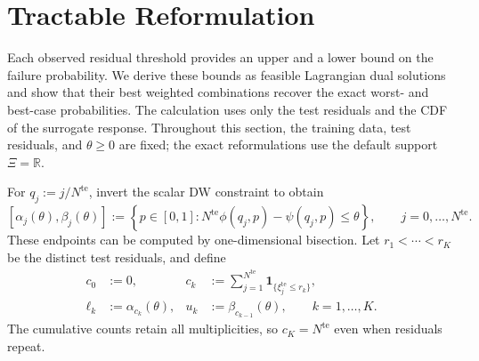 \section{Tractable Reformulation}
\label{sec-reformulation}

Each observed residual threshold provides an upper and a lower bound on the failure probability. We derive these bounds as feasible Lagrangian dual solutions and show that their best weighted combinations recover the exact worst- and best-case probabilities. The calculation uses only the test residuals and the CDF of the surrogate response. Throughout this section, the training data, test residuals, and $\theta\ge0$ are fixed; the exact reformulations use the default support $\Xi=\mathbb R$.

For $q_j:=j/N^{\mathrm{te}}$, invert the scalar DW constraint to obtain
\begin{equation}
  \left[\alpha_j(\theta),\beta_j(\theta)\right]
  :=\left\{p\in[0,1]:
  N^{\mathrm{te}}\phi\left(q_j,p\right)-\psi\left(q_j,p\right)\le\theta\right\},
  \qquad j=0,\ldots,N^{\mathrm{te}}.
  \label{eq-dw-rank-acceptance}
\end{equation}
These endpoints can be computed by one-dimensional bisection. Let $r_1<\cdots<r_K$ be the distinct test residuals, and define
\begin{equation}
  \begin{aligned}
    c_0&:=0,&
    c_k&:=\sum_{j=1}^{N^{\mathrm{te}}}\mathbf1_{\{\xi_j^{\mathrm{te}}\le r_k\}},\\
    \ell_k&:=\alpha_{c_k}(\theta),&
    u_k&:=\beta_{c_{k-1}}(\theta),\qquad k=1,\ldots,K.
  \end{aligned}
  \label{eq-dw-counts-and-levels}
\end{equation}
The cumulative counts retain all multiplicities, so $c_K=N^{\mathrm{te}}$ even when residuals repeat.

